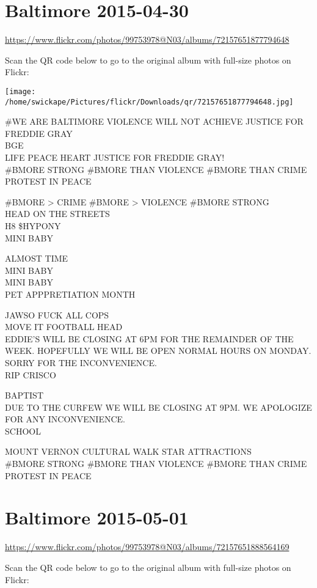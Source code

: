 \documentclass[10pt,letterpaper]{article}
\begin{document}
\section*{Baltimore 2015-04-30}

\url{https://www.flickr.com/photos/99753978@N03/albums/72157651877794648}

Scan the QR code below to go to the original album with full-size photos on Flickr:

\texttt{[image: /home/swickape/Pictures/flickr/Downloads/qr/72157651877794648.jpg]}


\#WE ARE BALTIMORE VIOLENCE WILL NOT ACHIEVE JUSTICE FOR FREDDIE GRAY\\
BGE\\
LIFE PEACE HEART JUSTICE FOR FREDDIE GRAY!\\
\#BMORE STRONG \#BMORE THAN VIOLENCE \#BMORE THAN CRIME PROTEST IN PEACE

\#BMORE > CRIME \#BMORE > VIOLENCE \#BMORE STRONG\\
HEAD ON THE STREETS\\
H8 \$HYPONY\\
MINI BABY

ALMOST TIME\\
MINI BABY\\
MINI BABY\\
PET APPPRETIATION MONTH

JAWSO FUCK ALL COPS\\
MOVE IT FOOTBALL HEAD\\
EDDIE'S WILL BE CLOSING AT 6PM FOR THE REMAINDER OF THE WEEK.  HOPEFULLY WE WILL BE OPEN NORMAL HOURS ON MONDAY.  SORRY FOR THE INCONVENIENCE.\\
RIP CRISCO

BAPTIST\\
DUE TO THE CURFEW WE WILL BE CLOSING AT 9PM.  WE APOLOGIZE FOR ANY INCONVENIENCE.\\
SCHOOL

MOUNT VERNON CULTURAL WALK STAR ATTRACTIONS\\
\#BMORE STRONG \#BMORE THAN VIOLENCE \#BMORE THAN CRIME PROTEST IN PEACE


\section*{Baltimore 2015-05-01}

\url{https://www.flickr.com/photos/99753978@N03/albums/72157651888564169}

Scan the QR code below to go to the original album with full-size photos on Flickr:
\end{document}
